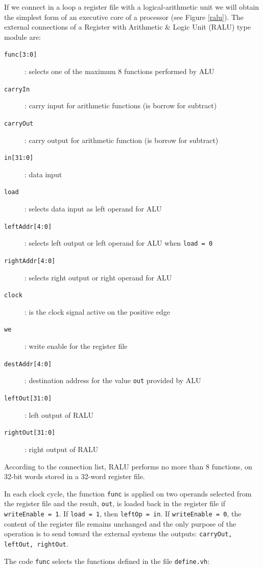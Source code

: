 If we connect in a loop a register file with a logical-arithmetic unit we will obtain the simplest form of an executive core of a processor (see Figure \ref{ralu}). The external connections of a Register with Arithmetic \& Logic Unit (RALU) type module are:
\begin{description}
    \item[{\tt func[3:0]}]: selects one of the maximum 8 functions performed by ALU
    \item[{\tt carryIn}]: carry input for arithmetic functions (is borrow for subtract)
    \item[{\tt carryOut}]: carry output for arithmetic function (is borrow for subtract)
    \item[{\tt in[31:0]}]: data input
    \item[{\tt load}]: selects data input as left operand for ALU
    \item[{\tt leftAddr[4:0]}]: selects left output or left operand for ALU when {\tt load = 0}
    \item[{\tt rightAddr[4:0]}]: selects right output or right operand for ALU
    \item[{\tt clock}]: is the clock signal active on the positive edge
    \item[{\tt we}]: write enable for the register file
    \item[{\tt destAddr[4:0]}]: destination address for the value {\tt out} provided by ALU
    \item[{\tt leftOut[31:0]}]: left output of RALU
    \item[{\tt rightOut[31:0]}]: right output of RALU
\end{description}
According to the connection list, RALU performs no more than 8 functions, on 32-bit words stored in a 32-word register file.


In each clock cycle, the function {\tt func} is applied on two operands  selected from the register file and the result, {\tt out}, is loaded back in the register file if {\tt writeEnable = 1}. If {\tt load = 1}, then {\tt leftOp = in}. If {\tt writeEnable = 0}, the content of the register file remains unchanged and the only purpose of the operation is to send toward the external systems the outputs: {\tt carryOut, leftOut, rightOut}.

The code {\tt func} selects the  functions defined in the file {\tt define.vh}:


